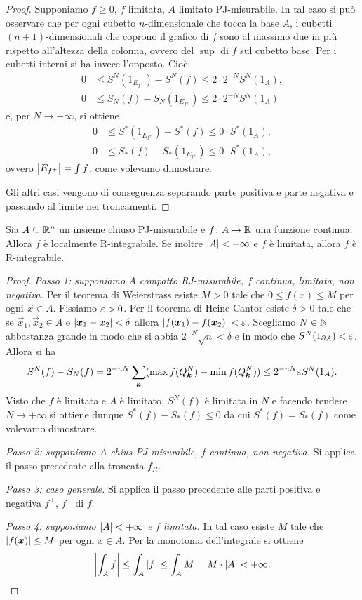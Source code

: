 \begin{proof}
Supponiamo $f\ge 0$, $f$ limitata, $A$ limitato PJ-misurabile.
In tal caso si può osservare che 
per ogni cubetto $n$-dimensionale che tocca la base $A$, 
i cubetti $(n+1)$-dimensionali che coprono il grafico di $f$ 
sono al massimo due in più rispetto all'altezza della colonna, 
ovvero del $\sup$ di $f$ 
sul cubetto base. Per i cubetti interni si ha invece l'opposto. Cioè:
\begin{align*}
    0 & \le S^N(1_{E_{f^+}}) - S^N(f) \le 2\cdot 2^{-N} S^N(1_A),\\
    0 & \le S_N(f) - S_N(1_{E_{f^+}}) \le 2\cdot 2^{-N} S^N(1_A)
\end{align*}
e, per $N\to +\infty$, si ottiene 
\begin{align*}
  0 &\le S^*(1_{E_{f^+}}) - S^*(f) \le 0\cdot S^*(1_A), \\
  0 &\le S_*(f) - S_*(1_{E_{f^+}}) \le 0\cdot S^*(1_A), 
\end{align*}
ovvero ${\left|E_{f^+}\right|}=\int f$, come volevamo dimostrare.

Gli altri casi vengono di conseguenza separando parte positiva e parte negativa 
e passando al limite nei troncamenti.
\end{proof}

\begin{theorem}
Sia $A\subseteq {\mathbb R}^n$ un insieme chiuso PJ-misurabile e $f\colon A \to {\mathbb R}$ una funzione 
continua. Allora $f$ è localmente R-integrabile. 
Se inoltre ${\left|A\right|}<+\infty$ e $f$ 
è limitata, allora $f$ è R-integrabile.
\end{theorem}
%
\begin{proof}
\emph{Passo 1: supponiamo $A$ compatto RJ-misurabile, 
$f$ continua, limitata, non negativa.}
Per il teorema di Weierstrass esiste $M>0$ tale che $0\le f(x) \le M$ per 
ogni $\vec x \in A$.
Fissiamo $\varepsilon>0$.
Per il teorema di Heine-Cantor esiste $\delta>0$ tale 
che se $\vec x_1,\vec x_2\in A$ e ${\left|\boldsymbol x_1 -\boldsymbol x_2\right|}<\delta$ 
allora ${\left|f(\boldsymbol x_1)-f(\boldsymbol x_2)\right|}< \varepsilon$. 
Scegliamo $N\in {\mathbb N}$ abbastanza grande in modo che si abbia $2^{-N}\sqrt n < \delta$
e in modo che $S^N(1_{\partial A})<\varepsilon$.
Allora si ha
\[
  S^N(f) - S_N(f) 
  = 2^{-nN}\sum_{\boldsymbol k} (\max f(Q^N_{\boldsymbol k})-\min f(Q^N_{\boldsymbol k})) 
  \le 2^{-nN}\varepsilon S^N(1_A).
\]
Visto che $f$ è limitata e $A$ è limitato, $S^N(f)$ è limitata in $N$ 
e facendo tendere $N\to+\infty$ si ottiene 
dunque $S^*(f)-S_*(f) \le 0$ da cui $S^*(f)=S_*(f)$ come volevamo dimostrare.

\emph{Passo 2: supponiamo $A$ chius PJ-misurabile, $f$ continua, non negativa.} 
Si applica il passo precedente alla troncata $f_R$.

\emph{Passo 3: caso generale.}
Si applica il passo precedente alle parti 
positiva e negativa $f^+$, $f^-$ di $f$.

\emph{Passo 4: supponiamo ${\left|A\right|}<+\infty$ e $f$ limitata.}  
In tal caso esiste $M$ tale che ${\left|f(\boldsymbol x)\right|}\le M$ per 
ogni $x\in A$. 
Per la monotonia dell'integrale si ottiene 
\[
  {\left|\int_A f\right|} 
  \le \int_A {\left|f\right|}
  \le \int_A M = M \cdot {\left|A\right|} < +\infty.  
\]
\end{proof}

